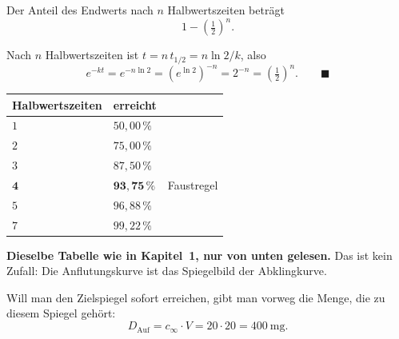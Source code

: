 \begin{merksatz}
Der Anteil des Endwerts nach $n$ Halbwertszeiten beträgt
\[ 1 - \left(\tfrac12\right)^{n} . \]

Nach $n$ Halbwertszeiten ist $t = n\,t_{1/2} = n\ln2/k$, also
\[ e^{-kt} = e^{-n\ln 2} = \left(e^{\ln 2}\right)^{-n} = 2^{-n} = \left(\tfrac12\right)^{n} . \qquad \blacksquare \]

\begin{center}
\renewcommand{\arraystretch}{1.45}
\begin{tabular}{@{}P{2.8cm}P{2.2cm}P{2.4cm}@{}}
\toprule
\textbf{Halbwerts\-zeiten} & \textbf{erreicht} & \\
\midrule
$1$ & $50{,}00\,\%$ & \\
$2$ & $75{,}00\,\%$ & \\
$3$ & $87{,}50\,\%$ & \\
$\mathbf{4}$ & $\mathbf{93{,}75\,\%}$ & \textcolor{gruen}{Faustregel}\\
$5$ & $96{,}88\,\%$ & \\
$7$ & $99{,}22\,\%$ & \\
\bottomrule
\end{tabular}
\end{center}

\begin{center}
\begin{minipage}{0.9\textwidth}
\textbf{Dieselbe Tabelle wie in Kapitel~1, nur von unten gelesen.} Das ist kein Zufall: Die Anflutungskurve ist das Spiegelbild der Abklingkurve.
\end{minipage}
\end{center}

\begin{center}
\begin{minipage}{0.88\textwidth}
\end{minipage}
\end{center}

Will man den Zielspiegel sofort erreichen, gibt man vorweg die Menge, die zu diesem Spiegel gehört:
\[ D_{\text{Auf}} = c_\infty \cdot V = 20 \cdot 20 = 400\ \mathrm{mg} . \]

\begin{center}
\begin{minipage}{0.88\textwidth}
\end{minipage}
\end{center}
\end{merksatz}

